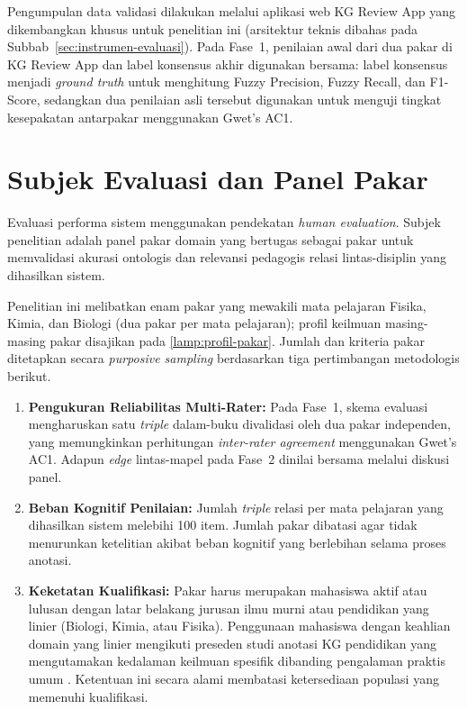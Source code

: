 \documentclass[../../thesis]{subfiles}
\begin{document}
Pengumpulan data validasi dilakukan melalui aplikasi web KG Review App
yang dikembangkan khusus untuk penelitian ini (arsitektur teknis dibahas
pada Subbab~\ref{sec:instrumen-evaluasi}). Pada Fase~1, penilaian awal dari
dua pakar di KG Review App dan label konsensus akhir digunakan bersama:
label konsensus menjadi \textit{ground truth} untuk menghitung
Fuzzy Precision, Fuzzy Recall, dan F1-Score, sedangkan dua penilaian asli tersebut
digunakan untuk menguji tingkat kesepakatan antarpakar menggunakan
Gwet's AC1.

\section{Subjek Evaluasi dan Panel Pakar}\label{subsec:subjek-evaluasi}

Evaluasi performa sistem menggunakan pendekatan \textit{human
evaluation}. Subjek penelitian adalah panel pakar domain yang bertugas
sebagai pakar untuk memvalidasi akurasi ontologis dan
relevansi pedagogis relasi lintas-disiplin yang dihasilkan sistem.

Penelitian ini melibatkan enam pakar yang mewakili mata
pelajaran Fisika, Kimia, dan Biologi (dua pakar per mata
pelajaran); profil keilmuan masing-masing pakar disajikan pada
\ref{lamp:profil-pakar}. Jumlah dan kriteria pakar ditetapkan secara
\textit{purposive sampling} berdasarkan tiga pertimbangan metodologis
berikut.

\begin{enumerate}
  \item \textbf{Pengukuran Reliabilitas Multi-Rater:} Pada Fase~1, skema
        evaluasi mengharuskan satu \textit{triple} dalam-buku divalidasi
        oleh dua pakar independen, yang memungkinkan perhitungan
        \textit{inter-rater agreement} menggunakan Gwet's AC1. Adapun
        \textit{edge} lintas-mapel pada Fase~2 dinilai bersama melalui
        diskusi panel.

  \item \textbf{Beban Kognitif Penilaian:} Jumlah \textit{triple}
        relasi per mata pelajaran yang dihasilkan sistem melebihi 100
        item. Jumlah pakar dibatasi agar tidak menurunkan ketelitian
        akibat beban kognitif yang berlebihan selama proses anotasi.

  \item \textbf{Keketatan Kualifikasi:} Pakar harus
        merupakan mahasiswa aktif atau lulusan dengan latar belakang
        jurusan ilmu murni atau pendidikan yang linier (Biologi, Kimia,
        atau Fisika). Penggunaan mahasiswa dengan keahlian domain yang
        linier mengikuti preseden studi anotasi KG pendidikan yang
        mengutamakan kedalaman keilmuan spesifik dibanding pengalaman
        praktis umum \parencite{wei_kicgpt_2023}. Ketentuan ini secara alami
        membatasi ketersediaan populasi yang memenuhi kualifikasi.
\end{enumerate}
\end{document}
